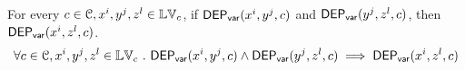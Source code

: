 %
%
%
%
\begin{lem}
	\label{lem:vardep_trans}
For every $c \in \mathcal{C}, x^i, y^j, z^l \in \mathbb{LV}_c$, 
if $\mathsf{DEP_{var}}(x^i, y^j, c)$ and 
$\mathsf{DEP_{var}}(y^j, z^l, c)$, then $\mathsf{DEP_{var}}(x^i, z^l, c)$.
	\[
	\forall c \in \mathcal{C}, x^i, y^j, z^l \in \mathbb{LV}_c ~.~ 
	\mathsf{DEP_{var}}(x^i, y^j, c) 
	\land
	\mathsf{DEP_{var}}(y^j, z^l, c) 
	\implies
	\mathsf{DEP_{var}}(x^i, z^l, c)
	\]
  \end{lem}
%
